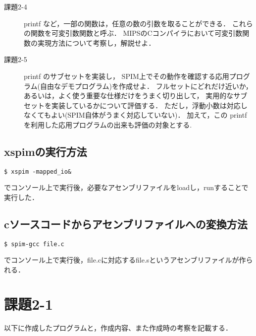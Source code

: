 \documentclass[a4j,11pt]{jarticle}
\begin{document}
\begin{description}
\item[課題2-4]printf など，一部の関数は，任意の数の引数を取ることができる． これらの関数を可変引数関数と呼ぶ． MIPSのCコンパイラにおいて可変引数関数の実現方法について考察し，解説せよ．

\item[課題2-5]printf のサブセットを実装し， SPIM上でその動作を確認する応用プログラム(自由なデモプログラム)を作成せよ． フルセットにどれだけ近いか，あるいは，よく使う重要な仕様だけをうまく切り出して， 実用的なサブセットを実装しているかについて評価する． ただし，浮動小数は対応しなくてもよい(SPIM自体がうまく対応していない)． 加えて，この printf を利用した応用プログラムの出来も評価の対象とする.

\end{description}
\subsection{xspimの実行方法}
\begin{verbatim}
$ xspim -mapped_io&
\end{verbatim}
でコンソール上で実行後，必要なアセンブリファイルをloadし，runすることで実行した．

\subsection{cソースコードからアセンブリファイルへの変換方法} 
\begin{verbatim}
$ spim-gcc file.c
\end{verbatim}
でコンソール上で実行後，file.cに対応するfile.sというアセンブリファイルが作られる．
 \section{課題2-1}
以下に作成したプログラムと，作成内容、また作成時の考察を記載する．
\end{document}
